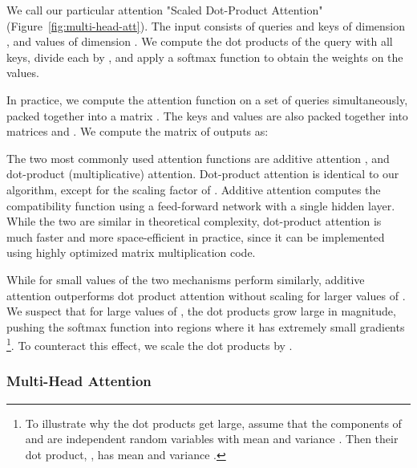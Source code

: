 \documentclass{article}
\begin{document}
We call our particular attention "Scaled Dot-Product Attention" (Figure~\ref{fig:multi-head-att}).   The input consists of queries and keys of dimension , and values of dimension .  We compute the dot products of the query with all keys, divide each by , and apply a softmax function to obtain the weights on the values.

In practice, we compute the attention function on a set of queries simultaneously, packed together into a matrix .   The keys and values are also packed together into matrices  and .  We compute the matrix of outputs as:



The two most commonly used attention functions are additive attention \citep{bahdanau2014neural}, and dot-product (multiplicative) attention.  Dot-product attention is identical to our algorithm, except for the scaling factor of . Additive attention computes the compatibility function using a feed-forward network with a single hidden layer.  While the two are similar in theoretical complexity, dot-product attention is much faster and more space-efficient in practice, since it can be implemented using highly optimized matrix multiplication code. 







While for small values of  the two mechanisms perform similarly, additive attention outperforms dot product attention without scaling for larger values of  \citep{DBLP:journals/corr/BritzGLL17}. We suspect that for large values of , the dot products grow large in magnitude, pushing the softmax function into regions where it has extremely small gradients  \footnote{To illustrate why the dot products get large, assume that the components of  and  are independent random variables with mean  and variance .  Then their dot product, , has mean  and variance .}. To counteract this effect, we scale the dot products by .





\subsubsection{Multi-Head Attention} \label{sec:multihead}
\end{document}
